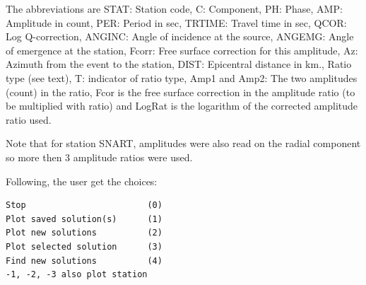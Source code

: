 The abbreviations are STAT: Station code, C: Component, PH: Phase, AMP: Amplitude in count, PER: Period in sec, TRTIME: Travel time in sec, QCOR: Log Q-correction, ANGINC: Angle of incidence at the source, ANGEMG: Angle of emergence at the station, 
Fcorr: Free surface correction for this amplitude, 
Az: Azimuth from the event to the station, DIST: Epicentral distance in km., Ratio type (see text), T: indicator of ratio type, Amp1 and Amp2: The two amplitudes (count) in the ratio, Fcor is the free surface correction in the amplitude ratio (to be multiplied with ratio) and LogRat is the logarithm of the corrected amplitude ratio used.

Note that for station SNART, amplitudes were also read on the radial component so more then 3 amplitude ratios were used.

Following, the user get the choices:


\begin{verbatim}
Stop                        (0)
Plot saved solution(s)      (1)
Plot new solutions          (2)
Plot selected solution      (3)
Find new solutions          (4)
-1, -2, -3 also plot station 
\end{verbatim}

